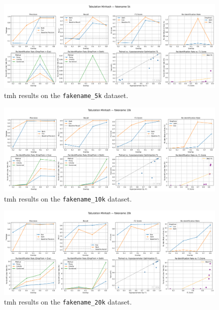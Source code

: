 \begin{figure}[H]
    \centering
    \includegraphics[width=\textwidth]{figures/TabMinHash_fakename_5k_metrics.png}
    \caption{\ac{tmh} results on the \texttt{fakename\_5k} dataset.}
    \label{fig:tabminhash_fakename5k}
\end{figure}

\begin{figure}[H]
    \centering
    \includegraphics[width=\textwidth]{figures/TabMinHash_fakename_10k_metrics.png}
    \caption{\ac{tmh} results on the \texttt{fakename\_10k} dataset.}
    \label{fig:tabminhash_fakename10k}
\end{figure}

\begin{figure}[H]
    \centering
    \includegraphics[width=\textwidth]{figures/TabMinHash_fakename_20k_metrics.png}
    \caption{\ac{tmh} results on the \texttt{fakename\_20k} dataset.}
    \label{fig:tabminhash_fakename20k}
\end{figure}

